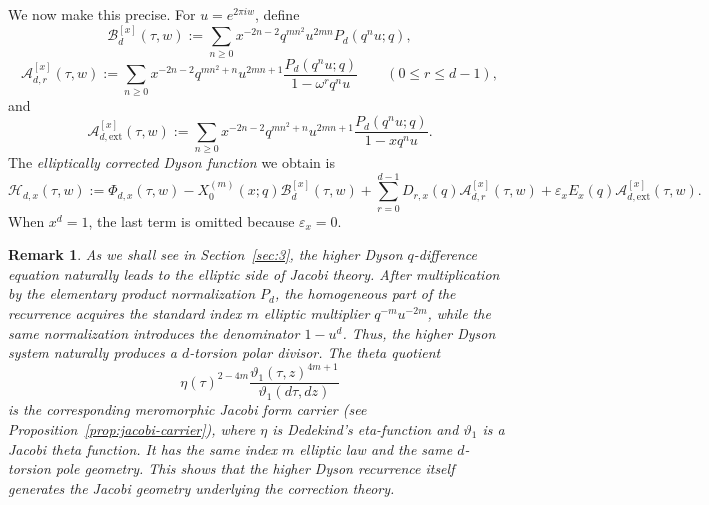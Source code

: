 \documentclass[12pt]{amsart}
\numberwithin{equation}{section}
\newtheorem{remark}{Remark}
\begin{document}
We now make this precise.
For \(u=e^{2\pi i w}\), define
\begin{equation}\label{eq:intro-B-kernel}
\mathcal B_d^{[x]}(\tau,w)
:=
\sum_{n\geq0}x^{-2n-2}q^{mn^2}u^{2mn}P_d(q^nu;q),
\end{equation}
\begin{equation}\label{eq:intro-Ar-kernel}
\mathcal A_{d,r}^{[x]}(\tau,w)
:=
\sum_{n\geq0}x^{-2n-2}q^{mn^2+n}u^{2mn+1}
\frac{P_d(q^nu;q)}{1-\omega^rq^nu}
\qquad(0\leq r\leq d-1),
\end{equation}
and
\begin{equation}\label{eq:intro-Aext-kernel}
\mathcal A_{d,\mathrm{ext}}^{[x]}(\tau,w)
:=
\sum_{n\geq0}x^{-2n-2}q^{mn^2+n}u^{2mn+1}
\frac{P_d(q^nu;q)}{1-xq^nu}.
\end{equation}
The {\it elliptically corrected Dyson function} we obtain is
\begin{equation}\label{eq:intro-H-definition}
\mathcal H_{d,x}(\tau,w)
:=
\Phi_{d,x}(\tau,w)
-
X_0^{(m)}(x;q)\mathcal B_d^{[x]}(\tau,w)
+
\sum_{r=0}^{d-1}D_{r,x}(q)\mathcal A_{d,r}^{[x]}(\tau,w)
+
\varepsilon_xE_x(q)\mathcal A_{d,\mathrm{ext}}^{[x]}(\tau,w).
\end{equation}
When \(x^d=1\), the last term is omitted because \(\varepsilon_x=0\).

\begin{remark} 
As we shall see in Section~\ref{sec:3},  the higher Dyson \(q\)-difference equation naturally leads to the elliptic side
of Jacobi theory.
After multiplication by the elementary product normalization \(P_d\), the homogeneous part of the recurrence acquires the standard index \(m\) elliptic multiplier
 \(q^{-m}u^{-2m}\), while the same
normalization introduces the denominator \(1-u^d\).  Thus, the higher
Dyson system naturally produces a \(d\)-torsion polar divisor.  The theta
quotient
\[
\eta(\tau)^{2-4m}
\frac{\vartheta_1(\tau,z)^{4m+1}}{\vartheta_1(d\tau,dz)}
\]
is the corresponding meromorphic Jacobi form carrier (see Proposition~\ref{prop:jacobi-carrier}),
where \(\eta\) is Dedekind's eta-function and \(\vartheta_1\) is a Jacobi theta function.
It has the same
index \(m\) elliptic law and the same \(d\)-torsion pole geometry.  This shows that the higher Dyson recurrence itself generates the
Jacobi geometry underlying the correction theory.
\end{remark}
\end{document}
